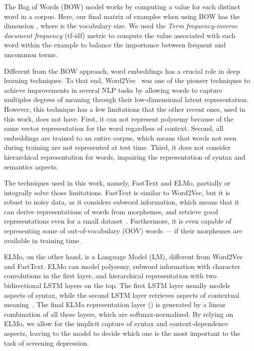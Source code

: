 \documentclass[letterpaper]{article} \usepackage{aaai20}  \usepackage{times}  \usepackage{helvet} \usepackage{courier}  \usepackage[hyphens]{url}  \usepackage{graphicx} \urlstyle{rm} \def\UrlFont{\rm}  \usepackage{graphicx}  \frenchspacing  \setlength{\pdfpagewidth}{8.5in}  \setlength{\pdfpageheight}{11in}  \usepackage[final]{changes}
\begin{document}
The Bag of Words (BOW) model works by computing a value for each distinct word in a corpus. Here, our final matrix of examples when using BOW has the dimension , where  is the vocabulary size. We used the \textit{Term frequency-inverse document frequency} (tf-idf) metric to compute the value associated with each word within the example to balance the importance between frequent and uncommon terms.

Different from the BOW approach, word embeddings has a crucial role in deep learning techniques. To that end, Word2Vec~\cite{mikolov2013distributed} was one of the pioneer techniques to achieve improvements in several NLP tasks by allowing words to capture multiples degrees of meaning through their low-dimensional latent representation. However, this technique has a few limitations that the other recent ones, used in this work, does not have. First, it can not represent polysemy because of the same vector representation for the word regardless of context. Second, all embeddings are trained to an entire corpus, which means that words not seen during training are not represented at test time. Third, it does not consider hierarchical representation for words, impairing the representation of syntax and semantics aspects.

The techniques used in this work, namely, FastText and ELMo, partially or integrally solve those limitations. FastText is similar to Word2Vec, but it is robust to noisy data, as it considers subword information, which means that it can derive representations of words from morphemes, and retrieve good representations even for a small dataset~\cite{bojanowski2017enriching}. Furthermore, it is even capable of representing some of out-of-vocabulary (OOV) words --- if their morphemes are available in training time.

ELMo, on the other hand, is a Language Model (LM), different from Word2Vec and FastText. ELMo can model polysemy, subword information with character convolutions in the first layer, and hierarchical representation with two bidirectional LSTM layers on the top. The first LSTM layer usually models aspects of syntax, while the second LSTM layer retrieves aspects of contextual meaning~\cite{peters2018deep}. The final ELMo representation layer () is generated by a linear combination of all these layers, which are softmax-normalized. By relying on ELMo, we allow for the implicit capture of syntax and context-dependence aspects, leaving to the model to decide which one is the most important to the task of screening depression.
\end{document}
